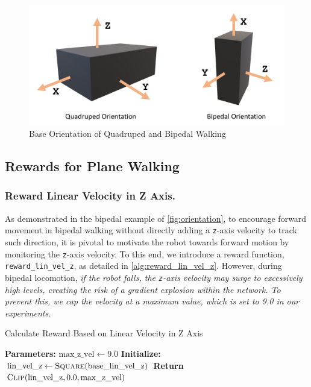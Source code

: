 \documentclass{article} %
\begin{document}
\begin{figure}[H]
   \centering
   \includegraphics[width=1.0\textwidth]{orientation.pdf}
   \caption{Base Orientation of Quadruped and Bipedal Walking}
   \label{fig:orientation}
\end{figure}


\subsection{Rewards for Plane Walking}
\label{sec:plane_walking}

\subsubsection{Reward Linear Velocity in Z Axis.} 


As demonstrated in the bipedal example of \autoref{fig:orientation}, to encourage forward movement in bipedal walking without directly adding a \texttt{z}-axis velocity to track such direction, it is pivotal to motivate the robot towards forward motion by monitoring the \texttt{z}-axis velocity. To this end, we introduce a reward function, \texttt{reward\_lin\_vel\_z}, as detailed in \autoref{alg:reward_lin_vel_z}. However, during bipedal locomotion, \textit{if the robot falls, the \texttt{z}-axis velocity may surge to excessively high levels, creating the risk of a gradient explosion within the network. To prevent this, we cap the velocity at a maximum value, which is set to 9.0 in our experiments.}

\begin{algorithm}[H]
\caption{Calculate Reward Based on Linear Velocity in Z Axis}
\label{alg:reward_lin_vel_z}
\begin{algorithmic}
    \State \textbf{Parameters:} $\text{max\_z\_vel} \gets 9.0$
    \State \textbf{Initialize:} $\text{lin\_vel\_z} \gets \Call{Square}{\text{base\_lin\_vel\_z}}$
    \State \textbf{Return} $\Call{Clip}{\text{lin\_vel\_z}, 0.0, \text{max\_z\_vel}}$
\EndFunction
\end{algorithmic}
\end{algorithm}
\end{document}
